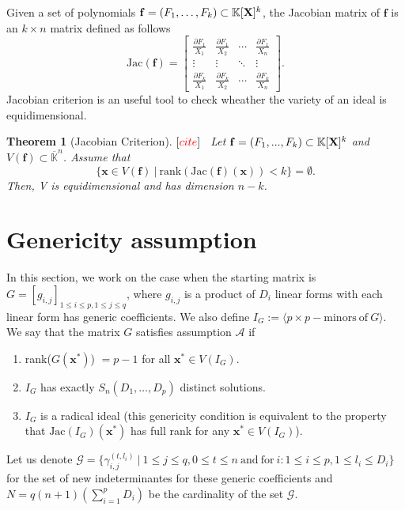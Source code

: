 \documentclass[11pt]{article}
\numberwithin{Property}{section}
\newtheorem{Theorem}{Theorem}%
\numberwithin{Theorem}{section}
\numberwithin{Proposition}{section}
\numberwithin{Lemma}{section}
\numberwithin{Corollary}{section}
\numberwithin{Definition}{section}
\numberwithin{Remark}{section}
\numberwithin{Conjecture}{section}
\numberwithin{Problem}{section}
\numberwithin{Example}{section}
\numberwithin{Claim}{section}
\renewcommand{\leq}{\leqslant}
\def\bar{\overline}
\newcommand{\field}{\mathbb{K}} %
\newcommand{\mat}[1]{\mathbf{\MakeUppercase{#1}}} %
\newcommand{\todo}[1]{\textcolor{red}{#1}} %
\begin{document}
Given a set of polynomials $\mathbf{f} = (F_1, \ldots, F_k) \subset \field[\mat{X}]^k$, the Jacobian matrix of $\mathbf{f}$ is an $k \times n$ matrix defined as follows 
\[
\mathrm{Jac}(\mathbf{f}) = \left[ \begin{matrix}
\frac{\partial F_1}{X_1} & \frac{\partial F_1}{X_2} & \cdots & \frac{\partial F_1}{X_n}\\
\vdots & \vdots & \ddots & \vdots\\
\frac{\partial F_k}{X_1} & \frac{\partial F_k}{X_2} & \cdots & \frac{\partial F_k}{X_n}
\end{matrix} \right].
\]
Jacobian criterion is an useful tool to check wheather the variety of an ideal is equidimensional. 
\begin{Theorem}[Jacobian Criterion] $[\todo{cite}]$  \
Let $\mathbf{f} = (F_1, ..., F_k) \subset \field[\mat{X}]^k$ and $V(\mathbf{f}) \subset \bar{\field}^n $. Assume that 
\[
\{\mathbf{x} \in V(\mathbf{f}) \ | \ \mathrm{rank}(\mathrm{Jac}(\mathbf{f})({\mathbf{x}})) < k\} = \emptyset .
\] Then, V is equidimensional and has dimension $n - k$.
\end{Theorem}
\section{Genericity assumption}
In this section, we work on the case when the starting matrix is $G = [g_{i,j}]_{1 \leq i \leq p, 1 \leq j \leq q}$, where $g_{i,j}$ is a product of $D_i$ linear forms with each linear form has generic coefficients. We also define $I_G := \langle p \times p - \mathrm{minors \ of} \ G \rangle$. We say that the matrix $G$ satisfies assumption $\mathcal{A}$ if 
\begin{enumerate}
\item rank($G(\mathbf{x}^*)$) $= p-1$ for all $\mathbf{x}^* \in V(I_G)$.
\item $I_G$ has exactly $S_{n}(D_1, \ldots, D_p)$ distinct solutions.  
\item $I_G$ is a radical ideal (this genericity condition is equivalent to the property that $\mathrm{Jac}(I_G)(\mathbf{x}^*)$ has full rank for any $\mathbf{x}^* \in V(I_G)$). 
\end{enumerate}
Let us denote $\mathcal{G} = \{\gamma_{i,j}^{(t,l_i)} \ | \ 1 \leq j \leq q, 0 \leq t \leq n \ \mathrm{and} \ \mathrm{for} \ i : 1 \leq i \leq p, 1 \leq l_i \leq D_i\}$ for the set of new indeterminantes for these generic coefficients and $N = q(n+1)(\sum_{i=1}^pD_i)$ be the cardinality of the set $\mathcal{G}$. 
\end{document}
